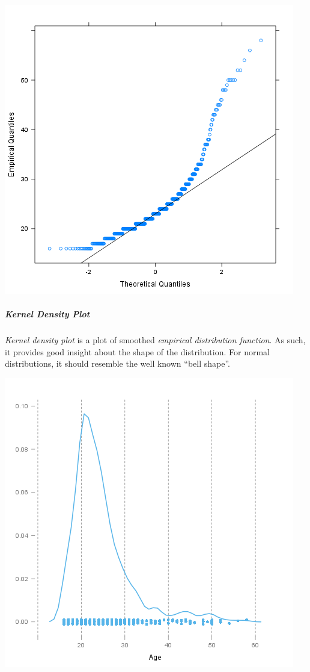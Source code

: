 \documentclass[]{article}
\makeatletter
\def\maxwidth{\ifdim\Gin@nat@width>\linewidth\linewidth
\else\Gin@nat@width\fi}
\let\Oldincludegraphics\includegraphics
\renewcommand{\includegraphics}[1]{\Oldincludegraphics[width=\maxwidth]{#1}}
\makeatother
\begin{document}
\href{131f20f388f78bd4863828d9fed8c35c-hires.png}{\includegraphics{131f20f388f78bd4863828d9fed8c35c.png}}

\subparagraph{Kernel Density Plot}

\emph{Kernel density plot} is a plot of smoothed \emph{empirical
distribution function}. As such, it provides good insight about the
shape of the distribution. For normal distributions, it should resemble
the well known ``bell shape''.

\href{b721e8de05c207e4bb17bbf28c7edda8-hires.png}{\includegraphics{b721e8de05c207e4bb17bbf28c7edda8.png}}
\end{document}
